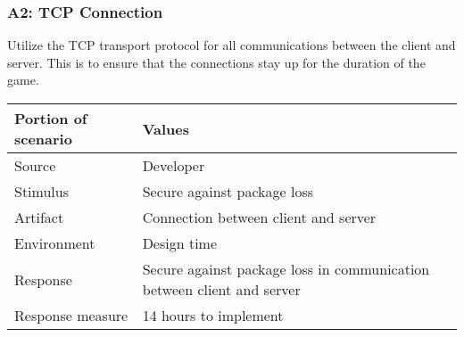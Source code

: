 \subsubsection*{A2: TCP Connection}
Utilize the TCP transport protocol for all communications between the client
and server. This is to ensure that the connections stay up for the duration
of the game.

\begin{tabular}{|m{}|m{}|}
\hline
{\bf Portion of scenario} & {\bf Values} \\ \hline
Source & Developer \\ \hline
Stimulus & Secure against package loss \\ \hline
Artifact & Connection between client and server \\ \hline
Environment & Design time \\ \hline
Response & Secure against package loss in communication between client and
server \\ \hline
Response measure & 14 hours to implement \\ \hline
\end{tabular}
